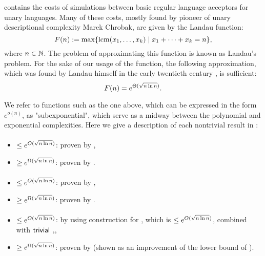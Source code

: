  contains the costs of simulations between basic regular language acceptors for unary languages.
Many of these costs, mostly found by pioneer of unary descriptional complexity Marek Chrobak, are given by the Landau function:
\begin{equation}
	F(n) := \max\{\operatorname{lcm}(x_1,\dots,x_k)\mid x_1+\dots+x_k=n\} \text,
\end{equation}
where $n\in\mathbb N$.
The problem of approximating this function is known as Landau's problem.
For the sake of our usage of the function, the following approximation, which was found by Landau himself in the early twentieth century \cite{Lan03,Lan09}, is sufficient:
\begin{equation}
	F(n) = e^{\Theta(\sqrt{n\ln n})} \text.
\end{equation}

We refer to functions such as the one above, which can be expressed in the form $e^{o(n)}$, as "subexponential", which serve as a midway between the polynomial and exponential complexities.
Here we give a description of each nontrivial result in :

\paragraph{\ONFA{}\tto\ODFA}
\begin{itemize}
	\item $\le e^{O(\sqrt{n\ln n})}$: proven by ,
	\item $\ge e^{\Omega(\sqrt{n\ln n})}$: proven by .
\end{itemize}
\paragraph{\TDFA{}\tto\ODFA}\label{cost:2DFAto1DFAu}
\begin{itemize}
	\item $\le e^{O(\sqrt{n\ln n})}$: proven by ,
	\item $\ge e^{\Omega(\sqrt{n\ln n})}$: proven by .
\end{itemize}
\paragraph{\TDFA{}\tto\ONFA}\label{cost:2DFAto1NFAu}
\begin{itemize}
	\item $\le e^{O(\sqrt{n\ln n})}$: by using construction for \hyperref[cost:2DFAto1DFAu]{\TDFA{}\tto\ODFA}, which is $\le e^{O(\sqrt{n\ln n})}$, combined with $\mathsf{trivial}$ \ODFA{}\tto\ONFA,,
	\item $\ge e^{\Omega(\sqrt{n\ln n})}$: proven by  (shown as an improvement of the lower bound of \hyperref[cost:2DFAto1DFAu]{\TDFA{}\tto\ODFA}).
\end{itemize}
